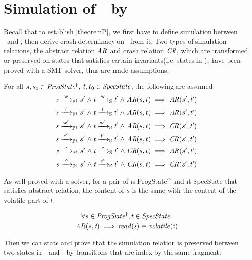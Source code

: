 \section{Simulation of~\ProgInv\ by~\Spec}
\label{sec:sim}
Recall that to establish \cref{theoremP}, we first have to define simulation between \Spec\ and \Prog, then derive crash-determinacy on \Prog\ from it. Two types of simulation relations, the abstract relation $\mathit{AR}$ and crash relation $\mathit{CR}$, which are transformed or preserved on states that satisfies certain invariants(i.e. states in \ProgInv), have been proved with a SMT solver, thus are made assumptions.
\begin{assumption}\label{PerOpCorrect}
	For all $s, s_0 \in \mathit{ProgState^\dagger}$, $t, t_0 \in \mathit{SpecState}$, the following are assumed:
\begin{align*}
s \ttPI{\awa{\actw}{\actw }} s' \conj t \ttS{\awa{\actw}{\actw }} t' \conj \i{AR}(s, t) &\implies \i{AR}(s', t')\\
s \ttPI{\awa{\actw}{\actf }} s' \conj t \ttS{\awa{\actw}{\actf }} t' \conj \i{AR}(s, t) &\implies \i{AR}(s', t')\\
s \ttPI{\awa{\actw}{\actwc}} s' \conj t \ttS{\awa{\actw}{\actwc}} t' \conj \i{AR}(s, t) &\implies \i{CR}(s', t')\\
s \ttPI{\awa{\actw}{\actfc}} s' \conj t \ttS{\awa{\actw}{\actfc}} t' \conj \i{AR}(s, t) &\implies \i{CR}(s', t')\\
s \ttPI{\awa{\actw}{\actr }} s' \conj t \ttS{\awa{\actw}{\actr }} t' \conj \i{CR}(s, t) &\implies \i{AR}(s', t')\\
s \ttPI{\awa{\actw}{\actrc}} s' \conj t \ttS{\awa{\actw}{\actrc}} t' \conj \i{CR}(s, t) &\implies \i{CR}(s', t')
\end{align*}
\end{assumption}
As well proved with a solver, for a pair of \i{s \in ProgState^\dagger} and \i{t \in SpecState} that satisfies abstract relation, the content of $s$ is the same with the content of the volatile part of $t$:
\begin{assumption}\label{ObsEquiv}
	\begin{multline*}
	 \forall \mathit{s} \in \mathit{ProgState^\dagger},t \in \mathit{SpecState} \ldotp \\
	 \mathit{AR(s, t)} \implies \mathit{read(s)} \equiv \mathit{volatile(t)} \\
	\end{multline*}
\end{assumption}
Then we can state and prove that the simulation relation is preserved between two states in~\ProgInv\ and~\Spec\ by transitions that are index by the same fragment:
